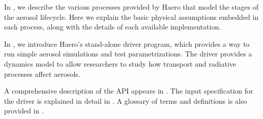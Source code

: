 In , we describe the various processes provided by Haero
that model the stages of the aerosol lifecycle. Here we explain the basic
physical assumptions embedded in each process, along with the details of each
available implementation.

In , we introduce Haero's stand-alone driver program, which
provides a way to run simple aerosol simulations and test parametrizations.
The driver provides a dynamics model to allow researchers to study how transport
and radiative processes affect aerosols.

A comprehensive description of the API appears in . The input
specification for the driver is explained in detail in .
A glossary of terms and definitions is also provided in .

